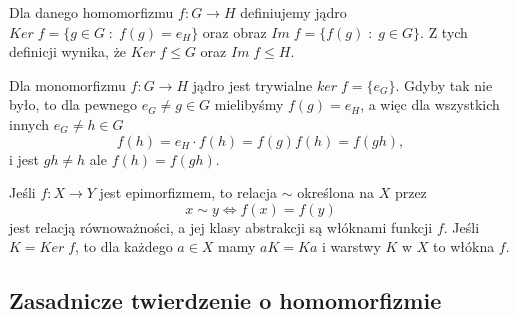 Dla danego homomorfizmu $f:G\to H$ definiujemy {\color{def}jądro} $Ker\; f=\{g\in G\;:\;f(g)=e_H\}$ oraz {\color{def}obraz} $Im\;f=\{f(g)\;:\;g\in G\}$. Z tych definicji wynika, że $Ker\;f\leq G$ oraz $Im\;f\leq H$.
\medskip

Dla monomorfizmu $f:G\to H$ jądro jest trywialne $ker\;f =\{e_G\}$. Gdyby tak nie było, to dla pewnego $e_G\neq g\in G$ mielibyśmy $f(g)=e_H$, a więc dla wszystkich innych $e_G\neq h\in G$
$$f(h)=e_H\cdot f(h)=f(g)f(h)=f(gh),$$
i jest $gh\neq h$ ale $f(h)=f(gh)$.
\bigskip

Jeśli $f:X\to Y$ jest epimorfizmem, to relacja $\sim$ określona na $X$ przez
$$x\sim y\iff f(x)=f(y)$$
jest relacją równoważności, a jej klasy abstrakcji są {\color{acc}włóknami funkcji $f$}. Jeśli $K=Ker\;f$, to dla każdego $a\in X$ mamy $aK=Ka$ i warstwy $K$ w $X$ to włókna $f$.

\subsection{Zasadnicze twierdzenie o homomorfizmie}